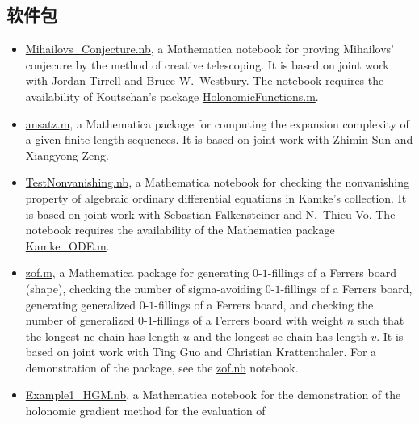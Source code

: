 \documentclass[a4paper,12pt]{article}
\begin{document}
\begin{CJK*}{UTF8}{gbsn}

\section*{\Large{软件包}}
\begin{itemize}
\item \href{https://yzhang1616.github.io/ct/Mihailovs_Conjecture.nb}{Mihailovs\_Conjecture.nb},  a Mathematica notebook for 
proving Mihailovs' conjecure by the method of creative telescoping. It is based on joint work
with Jordan Tirrell and Bruce W.\ Westbury.   The notebook requires the availability of Koutschan's package 
 \href{http://www.risc.jku.at/research/combinat/software/ergosum/RISC/HolonomicFunctions.html}{HolonomicFunctions.m}.
\item \href{https://yzhang1616.github.io/complexity/ansatz.m}{ansatz.m}, 
a Mathematica package for computing the expansion complexity of a given finite length sequences. 
It is based on joint work with Zhimin Sun and Xiangyong Zeng.
  \item \href{https://yzhang1616.github.io/TestNonvanishing.nb}{TestNonvanishing.nb}, 
    a Mathematica notebook for checking the nonvanishing property of algebraic ordinary
    differential equations in Kamke's collection. It is based on joint work
    with Sebastian Falkensteiner and N.\ Thieu Vo. 
    The notebook requires the availability of the Mathematica package \href{https://yzhang1616.github.io/Kamke_ODE.m}{Kamke\_ODE.m}.
  \item \href{https://yzhang1616.github.io/zof/zof.m}{zof.m}, a Mathematica package for generating $0$-$1$-fillings 
  of a Ferrers board (shape), checking the number of
    sigma-avoiding $0$-$1$-fillings of a Ferrers board, 
     generating generalized $0$-$1$-fillings of a Ferrers board, 
     and checking the number of generalized $0$-$1$-fillings of a Ferrers board with weight $n$
    such that the longest ne-chain has length $u$ 
    and the longest se-chain has length $v$. It is based on joint work with Ting
    Guo and Christian Krattenthaler. For a demonstration of the package,
    see the \href{https://yzhang1616.github.io/zof/zof.nb}{zof.nb} notebook. 
\item \href{https://yzhang1616.github.io/ec1/Example1_HGM.nb}{Example1\_HGM.nb}, a Mathematica notebook for
    the demonstration of the holonomic gradient method for the evaluation of

\end{itemize}
\end{CJK*}
\end{document}
